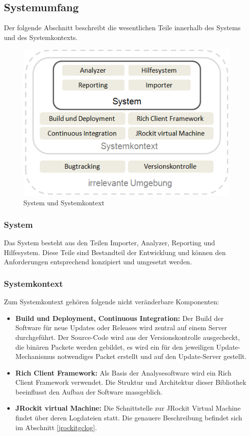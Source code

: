 \subsection{Systemumfang}
Der folgende Abschnitt beschreibt die wesentlichen Teile innerhalb des Systems und des Systemkontexts. 
 \begin{figure}[H]
  	\centering
    	\includegraphics{images/systemumfang}
        	\caption{System und Systemkontext}
\end{figure}
\subsubsection{System}
Das System besteht aus den Teilen Importer, Analyzer, Reporting und Hilfesystem. Diese Teile sind Bestandteil der Entwicklung und können den Anforderungen entsprechend konzipiert und umgesetzt werden.

\subsubsection{Systemkontext}
Zum Systemkontext gehören folgende nicht veränderbare Komponenten:
\begin{itemize}
	\item \textbf{Build und Deployment, Continuous Integration:} Der Build der Software für neue Updates oder Releases wird zentral auf einem Server durchgeführt. Der Source-Code wird aus der Versionskontrolle ausgecheckt, die binären Packete werden gebildet, es wird ein für den jeweiligen Update-Mechanismus notwendiges Packet erstellt und auf den Update-Server gestellt.

	\item \textbf{Rich Client Framework:} Als Basis der Analysesoftware wird ein Rich Client Framework verwendet. Die Struktur und Architektur dieser Bibliothek beeinflusst den Aufbau der Software massgeblich.
	\item \textbf{JRockit virtual Machine:} Die Schnittstelle zur JRockit Virtual Machine findet über deren Logdateien statt. Die genauere Beschreibung befindet sich im Abschnitt \ref{jrockitgclog}.
\end{itemize}


